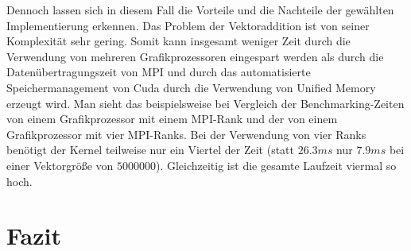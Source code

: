 \documentclass[doktyp=semarbeit, sprache=german]{TUBAFarbeiten}
\begin{document}
Dennoch lassen sich in diesem Fall die Vorteile und die Nachteile der gewählten Implementierung erkennen. Das Problem der Vektoraddition ist von seiner Komplexität sehr gering. Somit kann insgesamt weniger Zeit durch die Verwendung von mehreren Grafikprozessoren eingespart werden als durch die Datenübertragungszeit von MPI und durch das automatisierte Speichermanagement von Cuda durch die Verwendung von Unified Memory erzeugt wird. Man sieht das beispielsweise bei Vergleich der Benchmarking-Zeiten von einem Grafikprozessor mit einem MPI-Rank und der von einem Grafikprozessor mit vier MPI-Ranks. Bei der Verwendung von vier Ranks benötigt der Kernel teilweise nur ein Viertel der Zeit (statt $26.3  ms$ nur $7.9  ms$ bei einer Vektorgröße von $5 000 000$). Gleichzeitig ist die gesamte Laufzeit viermal so hoch.
\section{Fazit}
\newpage
{} 
\end{document}
